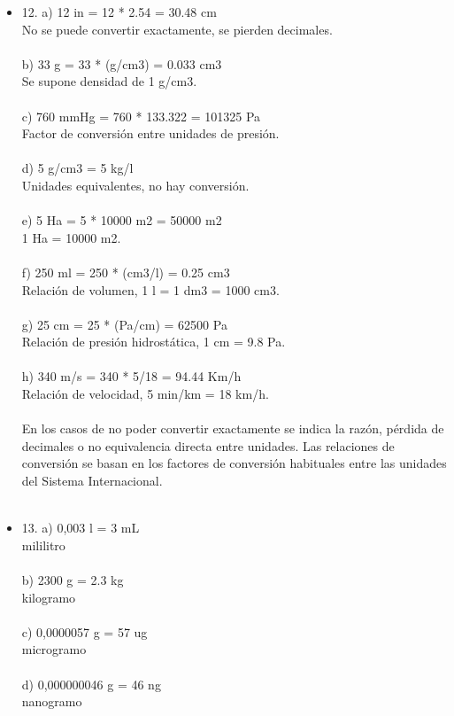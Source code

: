 \documentclass{article}
\begin{document}
\begin{itemize}
\item{12.}
a) 12 in = 12 * 2.54 = 30.48 cm\\
No se puede convertir exactamente, se pierden decimales.\\
\\
b) 33 g = 33 * (g/cm3) = 0.033 cm3\\
Se supone densidad de 1 g/cm3.\\
\\
c) 760 mmHg = 760 * 133.322 = 101325 Pa\\
Factor de conversión entre unidades de presión.\\
\\
d) 5 g/cm3 = 5 kg/l\\
Unidades equivalentes, no hay conversión.\\
\\
e) 5 Ha = 5 * 10000 m2 = 50000 m2\\
1 Ha = 10000 m2.\\
\\
f) 250 ml = 250 * (cm3/l) = 0.25 cm3\\
Relación de volumen, 1 l = 1 dm3 = 1000 cm3.\\
\\
g) 25 cm = 25 * (Pa/cm) = 62500 Pa\\
Relación de presión hidrostática, 1 cm = 9.8 Pa.\\
\\
h) 340 m/s = 340 * 5/18 = 94.44 Km/h\\
Relación de velocidad, 5 min/km = 18 km/h.\\
\\
En los casos de no poder convertir exactamente se indica la razón, pérdida de decimales o no equivalencia directa entre unidades. Las relaciones de conversión se basan en los factores de conversión habituales entre las unidades del Sistema Internacional.\\
\\
\item{13.}
a) 0,003 l = 3 mL\\
mililitro\\
\\
b) 2300 g = 2.3 kg\\
kilogramo\\
\\
c) 0,0000057 g = 57 ug\\
microgramo\\
\\
d) 0,000000046 g = 46 ng\\
nanogramo\\

\end{itemize}
\end{document}
